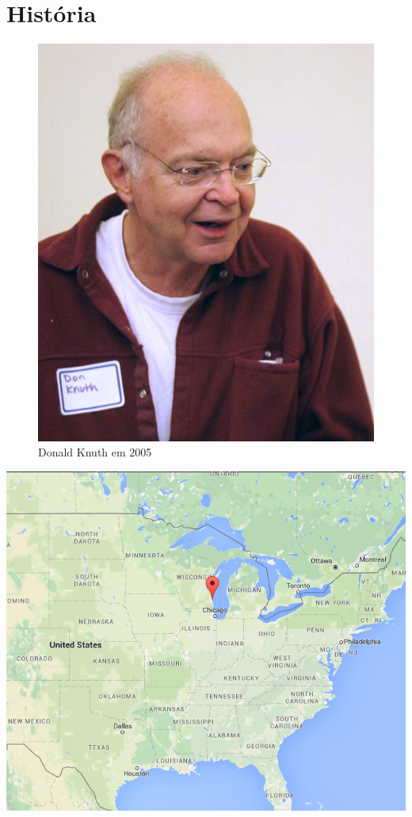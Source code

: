 \section{História}

\begin{frame}[plain]
  \begin{figure}[h]
    \includegraphics[scale=.5]{imagens/knuth}
    \caption{Donald Knuth em 2005}
  \end{figure}
\end{frame}

\begin{frame}[plain]
  \hspace*{-11.5mm}
  \begin{centering}
    \includegraphics[width=\pagewidth]{imagens/milwaukee}
  \end{centering}
\end{frame}

